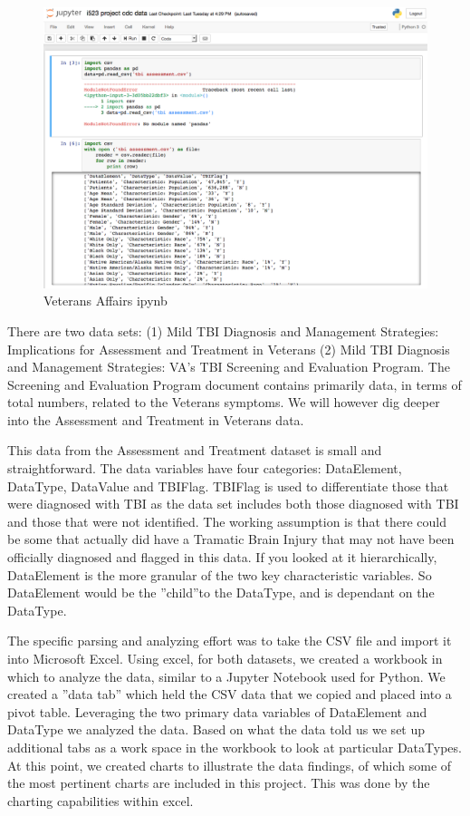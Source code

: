 \documentclass[sigconf]{acmart}
\begin{document}
\begin{figure}[h]
\includegraphics[width=\columnwidth]{images/graph4.png}
\caption{Veterans Affairs ipynb}\label{f:Veterans Affairs ipynb}
\end{figure}

There are two data sets: (1) Mild TBI Diagnosis and Management Strategies: Implications for Assessment and Treatment in Veterans (2) Mild TBI Diagnosis and Management Strategies: VA's TBI Screening and Evaluation Program. The Screening and Evaluation Program document contains primarily data, in terms of total numbers, related to the Veterans symptoms.  We will however dig deeper into the Assessment and Treatment in Veterans data.

This data from the Assessment and Treatment dataset is small and straightforward.  The data variables have four categories: DataElement, DataType, DataValue and TBIFlag.  TBIFlag is used to differentiate those that were diagnosed with TBI as the data set includes both those diagnosed with TBI and those that were not identified.  The working assumption is that there could be some that actually did have a Tramatic Brain Injury that may not have been officially diagnosed and flagged in this data. If you looked at it hierarchically, DataElement is the more granular of the two key characteristic variables.  So DataElement would be the ''child''to the DataType, and is dependant on the DataType. 

The specific parsing and analyzing effort was to take the CSV file and import it into Microsoft Excel.  Using excel, for both datasets, we created a workbook in which to analyze the data, similar to a Jupyter Notebook used for Python.  We created a ''data tab'' which held the CSV data that we copied and placed into a pivot table.  Leveraging the two primary data variables of DataElement and DataType we analyzed the data.  Based on what the data told us we set up additional tabs as a work space in the workbook to look at particular DataTypes.  At this point, we created charts to illustrate the data findings, of which some of the most pertinent charts are included in this project.  This was done by the charting capabilities within excel.
\end{document}
